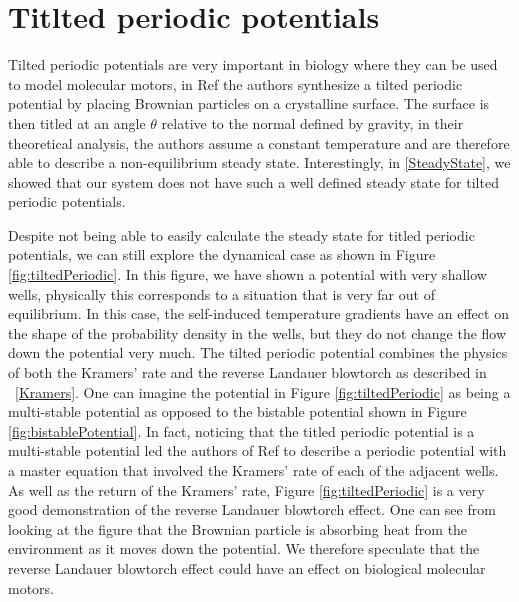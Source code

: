 
\section{Titlted periodic potentials}
Tilted periodic potentials are very important in biology where they can be used to model molecular motors, in Ref \cite{MaLaiAckersonEtAl2015, MaLaiAckersonEtAl2015a} the authors synthesize a tilted periodic potential by placing Brownian particles on a crystalline surface. The surface is then titled at an angle $\theta$ relative to the normal defined by gravity, in their theoretical analysis, the authors assume a constant temperature and are therefore able to describe a non-equilibrium steady state. Interestingly, in \autoref{SteadyState}, we showed that our system does not have such a well defined steady state for tilted periodic potentials.

Despite not being able to easily calculate the steady state for titled periodic potentials, we can still explore the dynamical case as shown in Figure \ref{fig:tiltedPeriodic}. In this figure, we have shown a potential with very shallow wells, physically this corresponds to a situation that is very far out of equilibrium. In this case, the self-induced temperature gradients have an effect on the shape of the probability density in the wells, but they do not change the flow down the potential very much. The tilted periodic potential combines the physics of both the Kramers' rate and the reverse Landauer blowtorch as described in ~\autoref{Kramers}. One can imagine the potential in Figure \ref{fig:tiltedPeriodic} as being a multi-stable potential as opposed to the bistable potential shown in Figure \ref{fig:bistablePotential}. In fact, noticing that the titled periodic potential is a multi-stable potential led the authors of Ref \cite{ChallisJack2014} to describe a periodic potential with a master equation that involved the Kramers' rate of each of the adjacent wells. As well as the return of the Kramers' rate, Figure \ref{fig:tiltedPeriodic} is a very good demonstration of the reverse Landauer blowtorch effect. One can see from looking at the figure that the Brownian particle is absorbing heat from the environment as it moves down the potential. We therefore speculate that the reverse Landauer blowtorch effect could have an effect on biological molecular motors.

